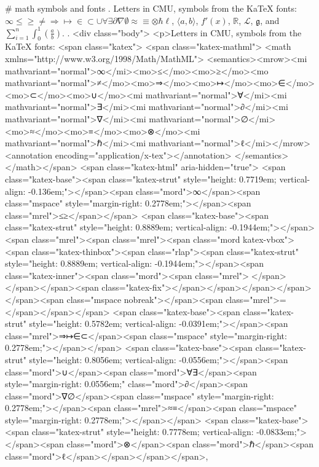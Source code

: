 #
math symbols and fonts
.
Letters in CMU, symbols from the KaTeX fonts:
$\infty \le \ge \ne \Rightarrow \mapsto \in \subset \cup \forall \exists \partial \nabla \emptyset \approx \equiv \otimes \hbar \ell$,
$\langle a, b \rangle$, $f'(x)$, $\mathbb{R}$, $\mathcal{L}$, $\mathfrak{g}$, and
$\displaystyle \sum_{i=1}^n \int_0^1 \left( \frac{a}{b} \right)$.
.
<div class="body">
<p>Letters in CMU, symbols from the KaTeX fonts: 
<span class="katex">
<span class="katex-mathml">
<math xmlns="http://www.w3.org/1998/Math/MathML">
<semantics><mrow><mi mathvariant="normal">∞</mi><mo>≤</mo><mo>≥</mo><mo mathvariant="normal">≠</mo><mo>⇒</mo><mo>↦</mo><mo>∈</mo><mo>⊂</mo><mo>∪</mo><mi mathvariant="normal">∀</mi><mi mathvariant="normal">∃</mi><mi mathvariant="normal">∂</mi><mi mathvariant="normal">∇</mi><mi mathvariant="normal">∅</mi><mo>≈</mo><mo>≡</mo><mo>⊗</mo><mi mathvariant="normal">ℏ</mi><mi mathvariant="normal">ℓ</mi></mrow>
<annotation encoding="application/x-tex">\infty \le \ge \ne \Rightarrow \mapsto \in \subset \cup \forall \exists \partial \nabla \emptyset \approx \equiv \otimes \hbar \ell</annotation>
</semantics>
</math></span>
<span class="katex-html" aria-hidden="true">
<span class="katex-base"><span class="katex-strut" style="height: 0.7719em; vertical-align: -0.136em;"></span><span class="mord">∞</span><span class="mspace" style="margin-right: 0.2778em;"></span><span class="mrel">≤≥</span></span>
<span class="katex-base"><span class="katex-strut" style="height: 0.8889em; vertical-align: -0.1944em;"></span><span class="mrel"><span class="mrel"><span class="mord katex-vbox"><span class="katex-thinbox"><span class="rlap"><span class="katex-strut" style="height: 0.8889em; vertical-align: -0.1944em;"></span><span class="katex-inner"><span class="mord"><span class="mrel"></span></span></span><span class="katex-fix"></span></span></span></span></span><span class="mspace nobreak"></span><span class="mrel">=</span></span></span>
<span class="katex-base"><span class="katex-strut" style="height: 0.5782em; vertical-align: -0.0391em;"></span><span class="mrel">⇒↦∈⊂</span><span class="mspace" style="margin-right: 0.2778em;"></span></span>
<span class="katex-base"><span class="katex-strut" style="height: 0.8056em; vertical-align: -0.0556em;"></span><span class="mord">∪</span><span class="mord">∀∃</span><span style="margin-right: 0.0556em;" class="mord">∂</span><span class="mord">∇∅</span><span class="mspace" style="margin-right: 0.2778em;"></span><span class="mrel">≈≡</span><span class="mspace" style="margin-right: 0.2778em;"></span></span>
<span class="katex-base"><span class="katex-strut" style="height: 0.7778em; vertical-align: -0.0833em;"></span><span class="mord">⊗</span><span class="mord">ℏ</span><span class="mord">ℓ</span></span></span></span>, 
